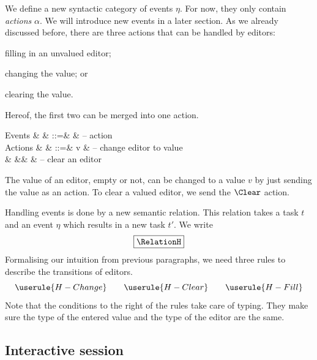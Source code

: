 We define a new syntactic category of events $\eta$.
For now, they only contain \emph{actions} $\alpha$.
We will introduce new events in a later section.
As we already discussed before,
there are three actions that can be handled by editors:
\begin{enumerate*}
  \item filling in an unvalued editor;
  \item changing the value; or
  \item clearing the value.
\end{enumerate*}
Hereof, the first two can be merged into one action.
\begin{grammar}
  Events
    & \eta   & ::=& \alpha & – action \\
  Actions
    & \alpha & ::=& v      & – change editor to value \\
    &        &\mid& \Clear & – clear an editor \\
\end{grammar}
The value of an editor, empty or not, can be changed to a value $v$ by just sending the value as an action.
To clear a valued editor, we send the $\Clear$ action.

Handling events is done by a new semantic relation.
This relation takes a task $t$ and an event $\eta$ which results in a new task $t'$.
We write
\begin{equation*}
  \boxed{\RelationH}
\end{equation*}
Formalising our intuition from previous paragraphs,
we need three rules to describe the transitions of editors.
\begin{equation*}
  \userule{H-Change} \qquad \userule{H-Clear} \qquad \userule{H-Fill}
\end{equation*}
Note that the conditions to the right of the rules take care of typing.
They make sure the type of the entered value and the type of the editor are the same.


\subsection{Interactive session}

